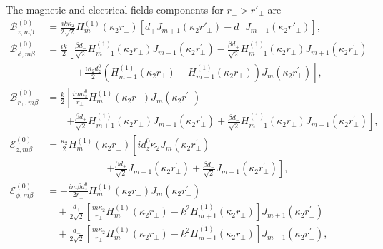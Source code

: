 \documentclass[preprint,aps,pra,onecolumn]{revtex4-1} %
\begin{document}
The magnetic and electrical fields components for $ r\!_\perp>r'\!_\perp $ are 
\begin{align}
\mathcal{B}_{z,m\beta}^{(0)} &= \frac{ik\kappa_2}{2\sqrt{2}}H^{(1)}_m(\kappa_2r\!_\perp)\left[ d_{+} J_{m+1}(\kappa_2r'\!\!_\perp) \!-\! d_- J_{m-1}(\kappa_2r'\!_\perp) \right],\\
\mathcal{B}_{\phi,m\beta}^{(0)} &= \frac{ik}{2}\left[ \frac{\beta d_{-}}{\sqrt{2}} H^{(1)}_{m-1}\left( \kappa_2r\!_\perp \right)J_{m-1}\left( {\kappa_2r\!_\perp^{\prime} }\right) -\frac{\beta d_+}{\sqrt{2}} H^{(1)}_{m+1}\left( \kappa_2r\!_\perp \right)J_{m+1}\left( {\kappa_2r\!_\perp^{\prime} }\right)\right. \nonumber\\ 
&\qquad\quad \left. + \frac{i\kappa_2d^0_z}{2}\left(H^{(1)}_{m-1}(\kappa_2r\!_\perp)-H^{(1)}_{m+1}(\kappa_2r\!_\perp) \right)J_m(\kappa_2r\!_\perp^{\prime}) \right],\\
\mathcal{B}_{r\!_\perp, m\beta}^{(0)} &= \frac{k}{2}\left[\frac{i m d^0_z}{r\!_\perp} H^{(1)}_m\left( \kappa_2r\!_\perp \right) J_m\left( {\kappa_2r\!_\perp^{\prime} }\right) \right. \nonumber\\
&\qquad \left. +\frac{\beta d_+}{\sqrt{2}} H^{(1)}_{m\!+\!1}(\kappa_2r\!_\perp) J_{m\!+\! 1}(\kappa_2r\!_\perp^{\prime}) \!+\! \frac{\beta d_-}{\sqrt{2}} H^{(1)}_{m\!-\! 1}(\kappa_2r\!_\perp) J_{m\!-\!1}(\kappa_2r\!_\perp^{\prime})   \right],\\
\mathcal{E}_{z,m\beta}^{(0)} 
&= \frac{\kappa_2}{2}H^{(1)}_{m}\left( \kappa_2r\!_\perp \right)\left[  id^0_z \kappa_2 J_m\left( {\kappa_2r\!_\perp^{\prime} }\right) \phantom{\frac{d^0_z}{\sqrt{2}}} \right. \nonumber\\
&\qquad\qquad\qquad \left. + \frac{\beta d_{+}}{\sqrt{2}} J_{m+1}\left( {\kappa_2r\!_\perp^{\prime} }\right) +\frac{\beta d_-}{\sqrt{2}} J_{m-1}\left( {\kappa_2r\!_\perp^{\prime} }\right) \right], \\
\mathcal{E}_{\phi,m\beta}^{(0)} 
&= -\frac{im\beta d^0_z}{2r\!_\perp} H^{(1)}_{m}\left( \kappa_2r\!_\perp \right) J_m\left( {\kappa_2r\!_\perp^{\prime} }\right) \nonumber\\
&\quad+\frac{d_+}{2\sqrt{2}} \left[ \frac{m\kappa_2}{r\!_\perp}H^{(1)}_{m}\left( \kappa_2r\!_\perp \right)-k^2 H^{(1)}_{m+1}\left( \kappa_2r\!_\perp \right)\right] J_{m+1}\left( {\kappa_2r\!_\perp^{\prime} }\right) \nonumber\\
&\quad+ \frac{d_-}{2\sqrt{2}}\left[\frac{m\kappa_2}{r\!_\perp}H^{(1)}_m\!\left( \kappa_2r_\perp \right)-k^2 H^{(1)}_{m-1}\!\left( \kappa_2r_\perp \right) \right] J_{m-1}\!\left( {\kappa_2r\!_\perp^{\prime} }\right),\\

\end{align}
\end{document}
